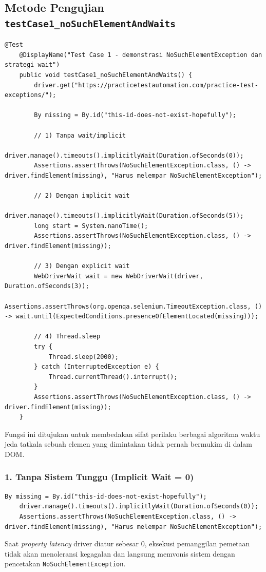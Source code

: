 \documentclass[a4paper,oneside,12pt]{report}
\begin{document}
\subsection{Metode Pengujian \texttt{testCase1\_noSuchElementAndWaits}}
\begin{lstlisting}[style=javastyle, caption=Metode Utuh \texttt{testCase1\_noSuchElementAndWaits}]
    @Test
    @DisplayName("Test Case 1 - demonstrasi NoSuchElementException dan strategi wait")
    public void testCase1_noSuchElementAndWaits() {
        driver.get("https://practicetestautomation.com/practice-test-exceptions/");

        By missing = By.id("this-id-does-not-exist-hopefully");

        // 1) Tanpa wait/implicit
        driver.manage().timeouts().implicitlyWait(Duration.ofSeconds(0));
        Assertions.assertThrows(NoSuchElementException.class, () -> driver.findElement(missing), "Harus melempar NoSuchElementException");

        // 2) Dengan implicit wait
        driver.manage().timeouts().implicitlyWait(Duration.ofSeconds(5));
        long start = System.nanoTime();
        Assertions.assertThrows(NoSuchElementException.class, () -> driver.findElement(missing));

        // 3) Dengan explicit wait
        WebDriverWait wait = new WebDriverWait(driver, Duration.ofSeconds(3));
        Assertions.assertThrows(org.openqa.selenium.TimeoutException.class, () -> wait.until(ExpectedConditions.presenceOfElementLocated(missing)));

        // 4) Thread.sleep
        try {
            Thread.sleep(2000);
        } catch (InterruptedException e) {
            Thread.currentThread().interrupt();
        }
        Assertions.assertThrows(NoSuchElementException.class, () -> driver.findElement(missing));
    }
\end{lstlisting}
Fungsi ini ditujukan untuk membedakan sifat perilaku berbagai algoritma waktu jeda tatkala sebuah elemen yang dimintakan tidak pernah bermukim di dalam DOM.

\subsubsection*{1. Tanpa Sistem Tunggu (Implicit Wait = 0)}
\begin{lstlisting}[style=javastyle]
    By missing = By.id("this-id-does-not-exist-hopefully");
    driver.manage().timeouts().implicitlyWait(Duration.ofSeconds(0));
    Assertions.assertThrows(NoSuchElementException.class, () -> driver.findElement(missing), "Harus melempar NoSuchElementException");
\end{lstlisting}
Saat \textit{property latency} driver diatur sebesar 0, eksekusi pemanggilan pemetaan tidak akan menoleransi kegagalan dan langsung memvonis sistem dengan pencetakan \texttt{NoSuchElementException}.
\end{document}
